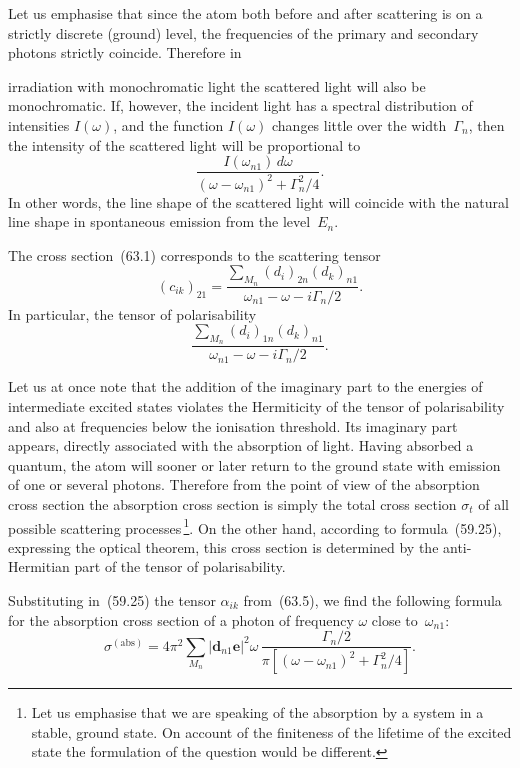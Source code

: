 Let us emphasise that since the atom both before and after scattering is on a strictly discrete (ground) level, the frequencies of the primary and secondary photons strictly coincide. Therefore in

irradiation with monochromatic light the scattered light will also be monochromatic. If, however, the incident light has a spectral distribution of intensities $I(\omega)$, and the function $I(\omega)$ changes little over the width~$\Gamma_n$, then the intensity of the scattered light will be proportional to
\[
\frac{I(\omega_{n1})\,d\omega}{(\omega - \omega_{n1})^2 + \Gamma^2_n/4}.
\tag{63.3}
\]
In other words, the line shape of the scattered light will coincide with the natural line shape in spontaneous emission from the level~$E_n$.

The cross section~(63.1) corresponds to the scattering tensor
\begin{equation}
(c_{ik})_{21} = \frac{\sum_{M_n}(d_i)_{2n}(d_k)_{n1}}{\omega_{n1} - \omega - i\Gamma_n/2}.
\tag{63.4}
\end{equation}
In particular, the tensor of polarisability
\begin{equation}
\frac{\sum_{M_n}(d_i)_{1n}(d_k)_{n1}}{\omega_{n1} - \omega - i\Gamma_n/2}.
\tag{63.5}
\end{equation}

Let us at once note that the addition of the imaginary part to the energies of intermediate excited states violates the Hermiticity of the tensor of polarisability and also at frequencies below the ionisation threshold. Its imaginary part appears, directly associated with the absorption of light. Having absorbed a quantum, the atom will sooner or later return to the ground state with emission of one or several photons. Therefore from the point of view of the absorption cross section the absorption cross section is simply the total cross section $\sigma_t$ of all possible scattering processes\,\footnote{Let us emphasise that we are speaking of the absorption by a system in a stable, ground state. On account of the finiteness of the lifetime of the excited state the formulation of the question would be different.}. On the other hand, according to formula~(59.25), expressing the optical theorem, this cross section is determined by the anti-Hermitian part of the tensor of polarisability.

Substituting in~(59.25) the tensor $\alpha_{ik}$ from~(63.5), we find the following formula for the absorption cross section of a photon of frequency $\omega$ close to~$\omega_{n1}$:
\begin{equation}
\sigma^{(\mathrm{abs})} = 4\pi^2\sum_{M_n}|\mathbf{d}_{n1}\mathbf{e}|^2\omega\,\frac{\Gamma_n/2}{\pi[(\omega - \omega_{n1})^2 + \Gamma^2_n/4]}.
\tag{63.6}
\end{equation}

